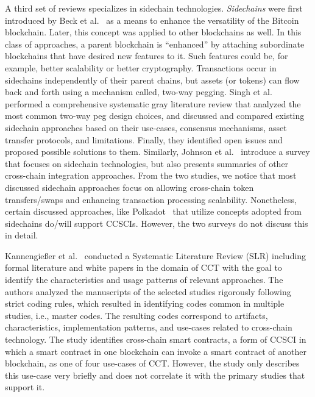 \documentclass[review]{elsarticle}
\begin{document}
A third set of reviews specializes in sidechain technologies.
\textit{Sidechains} were first introduced by Beck et al.~\cite{back2014sidechains} as a means to enhance the versatility of the Bitcoin blockchain.
Later, this concept was applied to other blockchains as well.
In this class of approaches, a parent blockchain is \enquote{enhanced} by attaching subordinate blockchains that have desired new features to it. 
Such features could be, for example, better scalability or better cryptography.
Transactions occur in sidechains independently of their parent chains, but assets (or tokens) can flow back and forth using a mechanism called, two-way pegging.
Singh et al.~\cite{Singh2020Sidechains} performed a comprehensive systematic gray literature review that analyzed the most common two-way peg design choices, and discussed and compared existing sidechain approaches based on their use-cases, consensus mechanisms, asset transfer protocols, and limitations.
Finally, they identified open issues and proposed possible solutions to them.
Similarly, Johnson et al.~\cite{Johnson2019Sidechains} introduce a survey that focuses on sidechain technologies, but also presents summaries of other cross-chain integration approaches.
From the two studies, we notice that most discussed sidechain approaches focus on allowing cross-chain token transfers/swaps and enhancing transaction processing scalability.
Nonetheless, certain discussed approaches, like Polkadot~\cite{Wood2016Polkadot} that utilize concepts adopted from sidechains do/will support CCSCIs.
However, the two surveys do not discuss this in detail.

Kannengie\ss{}er et al.~\cite{Kannengießer2020} conducted a Systematic Literature Review (SLR) including formal literature and white papers in the domain of CCT with the goal to identify the characteristics and usage patterns of relevant approaches.
The authors analyzed the manuscripts of the selected studies rigorously following strict coding rules, which resulted in identifying codes common in multiple studies, i.e., master codes.
The resulting codes correspond to artifacts, characteristics, implementation patterns, and use-cases related to cross-chain technology.
The study identifies cross-chain smart contracts, a form of CCSCI in which a smart contract in one blockchain can invoke a smart contract of another blockchain, as one of four use-cases of CCT.
However, the study only describes this use-case very briefly and does not correlate it with the primary studies that support it.
\end{document}
